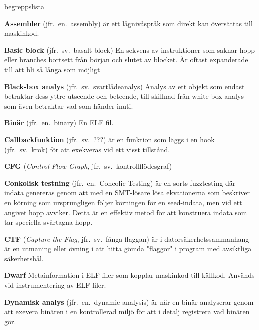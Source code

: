 \begin{labeling}{begreppslista}

    \item [\textbf{Assembler}] (jfr.\ en.\ assembly) är ett
    lågnivåspråk som direkt kan översättas till
    maskinkod.

    \item[\textbf{Basic block}] (jfr.\ sv.\ basalt block) En sekvens av
    instruktioner som saknar hopp eller branches bortsett från början och slutet
    av blocket. Är oftast expanderade till att bli så långa som möjligt

    \item [\textbf{Black-box analys}] (jfr.\ sv.\ svartlådeanalys) Analys av ett
    objekt som endast betraktar dess yttre utseende och beteende, till skillnad
    från white-box-analys som även betraktar vad som händer inuti.

    \item [\textbf{Binär}] (jfr.\ en.\ binary) En ELF fil.

    \item [\textbf{Callbackfunktion}] (jfr.\ sv.\ ???) är en funktion som läggs i en
    hook (jfr.\ sv.\ krok) för att exekveras vid ett visst tillstånd.

    \item [\textbf{CFG}] (\emph{Control Flow Graph}, jfr.\ sv.\
          kontrollflödesgraf)

    \item [\textbf{Conkolisk testning}] (jfr.\ en.\ Concolic Testing) är en sorts
    fuzztesting där indata genereras genom att med en SMT-lösare lösa
    ekvationerna som beskriver en körning som ursprungligen följer körningen för
    en seed-indata, men vid ett angivet hopp avviker. Detta är en effektiv metod
    för att konstruera indata som tar speciella svårtagna hopp.

    \item [\textbf{CTF}] (\emph{Capture the Flag}, jfr.\ sv.\ fånga flaggan) är i
    datorsäkerhetssammanhang är en utmaning eller övning i att hitta gömda
    "flaggor" i program med avsiktliga säkerhetshål.

    \item [\textbf{Dwarf}] Metainformation i ELF-filer som kopplar maskinkod
    till källkod. Används vid instrumentering av ELF-filer.

    \item [\textbf{Dynamisk analys}] (jfr.\ en.\ dynamic analysis) är när en binär
    analyserar genom att exevera binären i en kontrollerad miljö för att i
    detalj registrera vad binären gör.


\end{labeling}
